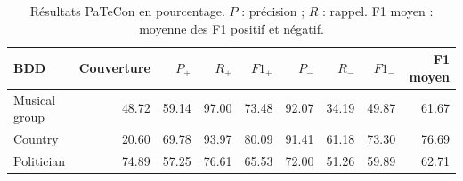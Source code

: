 \begin{table}[htbp]
\centering
\small
\setlength{\tabcolsep}{3pt}
\begin{tabular}{lrrrrrrrr}
\hline
BDD & Couverture & $P_+$ & $R_+$ & $F1_+$ & $P_-$ & $R_-$ & $F1_-$ & F1 moyen \\
\hline
Musical group & 48.72 & 59.14 & 97.00 & 73.48 & 92.07 & 34.19 & 49.87 & 61.67 \\
Country & 20.60 & 69.78 & 93.97 & 80.09 & 91.41 & 61.18 & 73.30 & 76.69 \\
Politician & 74.89 & 57.25 & 76.61 & 65.53 & 72.00 & 51.26 & 59.89 & 62.71 \\
\hline
\end{tabular}
\caption{Résultats PaTeCon en pourcentage. $P$ : précision ; $R$ : rappel. F1 moyen : moyenne des F1 positif et négatif.}
\label{tab:fact-checking-patecon}
\end{table}
